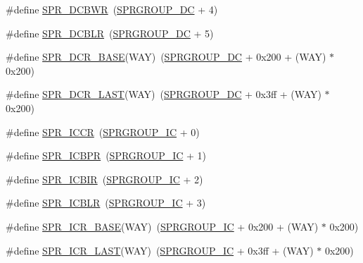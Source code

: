 \begin{DoxyCompactItemize}
\item 
\#define \hyperlink{spr-defs_8h_a66230bec41a8861fe385c8e9cbbd5d65}{\-S\-P\-R\-\_\-\-D\-C\-B\-W\-R}~(\hyperlink{spr-defs_8h_a3af62c82d89656aca627f13a831ad9f6}{\-S\-P\-R\-G\-R\-O\-U\-P\-\_\-\-D\-C} + 4)
\item 
\#define \hyperlink{spr-defs_8h_ac4c80e808287571a633357963c3d55ef}{\-S\-P\-R\-\_\-\-D\-C\-B\-L\-R}~(\hyperlink{spr-defs_8h_a3af62c82d89656aca627f13a831ad9f6}{\-S\-P\-R\-G\-R\-O\-U\-P\-\_\-\-D\-C} + 5)
\item 
\#define \hyperlink{spr-defs_8h_ad8842b1491709e5f9bbea4253bfd97eb}{\-S\-P\-R\-\_\-\-D\-C\-R\-\_\-\-B\-A\-S\-E}(\-W\-A\-Y)~(\hyperlink{spr-defs_8h_a3af62c82d89656aca627f13a831ad9f6}{\-S\-P\-R\-G\-R\-O\-U\-P\-\_\-\-D\-C} + 0x200 + (\-W\-A\-Y) $\ast$ 0x200)
\item 
\#define \hyperlink{spr-defs_8h_a399d03749eb14e540c5d3958e3002a6f}{\-S\-P\-R\-\_\-\-D\-C\-R\-\_\-\-L\-A\-S\-T}(\-W\-A\-Y)~(\hyperlink{spr-defs_8h_a3af62c82d89656aca627f13a831ad9f6}{\-S\-P\-R\-G\-R\-O\-U\-P\-\_\-\-D\-C} + 0x3ff + (\-W\-A\-Y) $\ast$ 0x200)
\item 
\#define \hyperlink{spr-defs_8h_a0d852739f3264e16091e466146a02fc9}{\-S\-P\-R\-\_\-\-I\-C\-C\-R}~(\hyperlink{spr-defs_8h_a5afbc4a1c478113d1de1080e0303db1a}{\-S\-P\-R\-G\-R\-O\-U\-P\-\_\-\-I\-C} + 0)
\item 
\#define \hyperlink{spr-defs_8h_a134a5ed85639d7f24b3da39d4eb6c839}{\-S\-P\-R\-\_\-\-I\-C\-B\-P\-R}~(\hyperlink{spr-defs_8h_a5afbc4a1c478113d1de1080e0303db1a}{\-S\-P\-R\-G\-R\-O\-U\-P\-\_\-\-I\-C} + 1)
\item 
\#define \hyperlink{spr-defs_8h_a683ac58cfd21a63927914ee7926db9ec}{\-S\-P\-R\-\_\-\-I\-C\-B\-I\-R}~(\hyperlink{spr-defs_8h_a5afbc4a1c478113d1de1080e0303db1a}{\-S\-P\-R\-G\-R\-O\-U\-P\-\_\-\-I\-C} + 2)
\item 
\#define \hyperlink{spr-defs_8h_a948b909f49e01d560763dc3c95be6041}{\-S\-P\-R\-\_\-\-I\-C\-B\-L\-R}~(\hyperlink{spr-defs_8h_a5afbc4a1c478113d1de1080e0303db1a}{\-S\-P\-R\-G\-R\-O\-U\-P\-\_\-\-I\-C} + 3)
\item 
\#define \hyperlink{spr-defs_8h_abc21eabf3ede553744e49ab6f850ed4c}{\-S\-P\-R\-\_\-\-I\-C\-R\-\_\-\-B\-A\-S\-E}(\-W\-A\-Y)~(\hyperlink{spr-defs_8h_a5afbc4a1c478113d1de1080e0303db1a}{\-S\-P\-R\-G\-R\-O\-U\-P\-\_\-\-I\-C} + 0x200 + (\-W\-A\-Y) $\ast$ 0x200)
\item 
\#define \hyperlink{spr-defs_8h_af508becc73e121efee060c13d982711d}{\-S\-P\-R\-\_\-\-I\-C\-R\-\_\-\-L\-A\-S\-T}(\-W\-A\-Y)~(\hyperlink{spr-defs_8h_a5afbc4a1c478113d1de1080e0303db1a}{\-S\-P\-R\-G\-R\-O\-U\-P\-\_\-\-I\-C} + 0x3ff + (\-W\-A\-Y) $\ast$ 0x200)

\end{DoxyCompactItemize}
